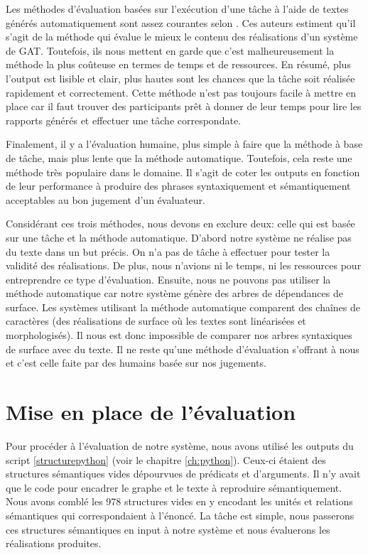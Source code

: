 Les méthodes d'évaluation basées sur l'exécution d'une tâche à l'aide de textes générés automatiquement sont assez courantes selon \cite{ReiterInvestigationValidityMetrics2009}. Ces auteurs estiment qu'il s'agit de la méthode qui évalue le mieux le contenu des réalisations d'un système de \ac{GAT}. Toutefois, ils nous mettent en garde que c'est malheureusement la méthode la plus coûteuse en termes de temps et de ressources. En résumé, plus l'output est lisible et clair, plus hautes sont les chances que la tâche soit réalisée rapidement et correctement. Cette méthode n'est pas toujours facile à mettre en place car il faut trouver des participants prêt à donner de leur temps pour lire les rapports générés et effectuer une tâche correspondate. 

Finalement, il y a l'évaluation humaine, plus simple à faire que la méthode à base de tâche, mais plus lente que la méthode automatique. Toutefois, cela reste une méthode très populaire dans le domaine. Il s'agit de coter les outputs en fonction de leur performance à produire des phrases syntaxiquement et sémantiquement acceptables au bon jugement d'un évaluateur.

Considérant ces trois méthodes, nous devons en exclure deux: celle qui est basée sur une tâche et la méthode automatique. D'abord notre système ne réalise pas du texte dans un but précis. On n'a pas de tâche à effectuer pour tester la validité des réalisations. De plus, nous n'avions ni le temps, ni les ressources pour entreprendre ce type d'évaluation. Ensuite, nous ne pouvons pas utiliser la méthode automatique car notre système génère des arbres de dépendances de surface. Les systèmes utilisant la méthode automatique comparent des chaînes de caractères (des réalisations de surface où les textes sont linéarisées et morphologisés). Il nous est donc impossible de comparer nos arbres syntaxiques de surface avec du texte. Il ne reste qu'une méthode d'évaluation s'offrant à nous et c'est celle faite par des humains basée sur nos jugements.

\section{Mise en place de l'évaluation}
Pour procéder à l'évaluation de notre système, nous avons utilisé les outputs du script \ref{structurepython} (voir le chapitre \ref{ch:python}). Ceux-ci étaient des structures sémantiques vides dépourvues de prédicats et d'arguments. Il n'y avait que le code pour encadrer le graphe et le texte à reproduire sémantiquement. Nous avons comblé les 978 structures vides en y encodant les unités et relations sémantiques qui correspondaient à l'énoncé. La tâche est simple, nous passerons ces structures sémantiques en input à notre système et nous évaluerons les réalisations produites.

